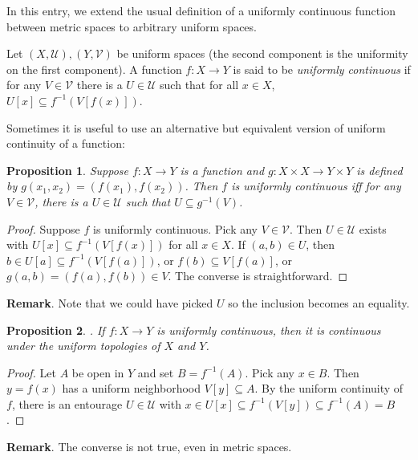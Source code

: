 \documentclass[12pt]{article}
\newtheorem{prop}{Proposition}
\begin{document}
In this entry, we extend the usual definition of a uniformly continuous function between metric spaces to arbitrary uniform spaces.

Let $(X,\mathcal{U}),(Y,\mathcal{V})$ be uniform spaces (the second component is the uniformity on the first component).  A function $f:X\to Y$ is said to be \emph{uniformly continuous} if for any $V\in\mathcal{V}$ there is a $U\in \mathcal{U}$ such that for all $x\in X$, $U[x]\subseteq f^{-1}(V[f(x)])$.

Sometimes it is useful to use an alternative but equivalent version of uniform continuity of a function:
\begin{prop}
Suppose $f:X\to Y$ is a function and $g:X\times X \to Y\times Y$ is defined by $g(x_1,x_2)=(f(x_1), f(x_2))$.  Then $f$ is uniformly continuous iff for any $V\in \mathcal{V}$, there is a $U\in \mathcal{U}$ such that $U\subseteq g^{-1}(V)$.
\end{prop}
\begin{proof}  Suppose $f$ is uniformly continuous.  Pick any $V\in \mathcal{V}$.  Then $U\in \mathcal{U}$ exists with $U[x]\subseteq f^{-1}(V[f(x)])$ for all $x\in X$.  If $(a,b)\in U$, then $b\in U[a]\subseteq f^{-1}(V[f(a)])$, or $f(b)\subseteq V[f(a)]$, or $g(a,b)=(f(a),f(b))\in V$.  The converse is straightforward.
\end{proof}

\textbf{Remark}.  Note that we could have picked $U$ so the inclusion becomes an equality.

\begin{prop}.  If $f:X\to Y$ is uniformly continuous, then it is continuous under the uniform topologies of $X$ and $Y$.\end{prop}
\begin{proof}
Let $A$ be open in $Y$ and set $B=f^{-1}(A)$.  Pick any $x\in B$.  Then $y=f(x)$ has a uniform neighborhood $V[y]\subseteq A$.  By the uniform continuity of $f$, there is an entourage $U\in \mathcal{U}$ with $x\in U[x]\subseteq f^{-1}(V[y])\subseteq f^{-1}(A)=B$.
\end{proof}

\textbf{Remark}.  The converse is not true, even in metric spaces.
\end{document}
